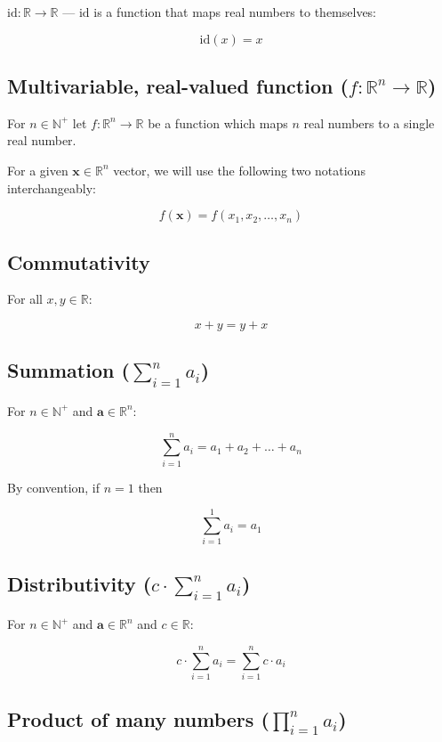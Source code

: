 \documentclass[titlepage]{article}
\begin{document}
        $\text{id} : \mathbb{R} \rightarrow \mathbb{R}$ --- $\text{id}$ is a
        function that maps real numbers to themselves:

        $$\text{id}(x) = x$$

      \subsection{%
        Multivariable, real-valued function
        ($f : \mathbb{R}^n \rightarrow \mathbb{R}$)
      }

        For $n \in \mathbb{N}^+$ let $f : \mathbb{R}^n \rightarrow \mathbb{R}$
        be a function which maps $n$ real numbers to a single real number.

        For a given $\mathbf{x} \in \mathbb{R}^n$ vector, we will use the
        following two notations interchangeably:

        $$f(\mathbf{x}) = f(x_1, x_2, \ldots, x_n)$$

      \subsection{Commutativity}

        For all $x, y \in \mathbb{R}$:

        $$x + y = y + x$$

      \subsection{Summation ($\sum_{i=1}^n a_i$)}

        For $n \in \mathbb{N}^+$ and $\mathbf{a} \in \mathbb{R}^n$:

        $$\sum_{i=1}^n a_i = a_1 + a_2 + \ldots + a_n$$

        By convention, if $n=1$ then

        $$\sum_{i=1}^1 a_i = a_1$$

      \subsection{Distributivity ($c \cdot \sum_{i=1}^n a_i$)}

        For $n \in \mathbb{N}^+$ and $\mathbf{a} \in \mathbb{R}^n$ and
        $c \in \mathbb{R}$:

        $$c \cdot \sum_{i=1}^n a_i = \sum_{i=1}^n c \cdot a_i$$

      \subsection{Product of many numbers ($\prod_{i=1}^n a_i$)}
\end{document}
